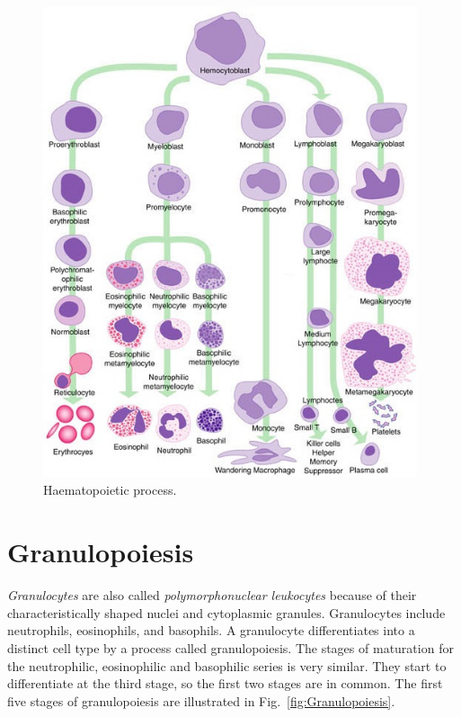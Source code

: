 \documentclass[final,a4paper,12pt,english]{UnicaPhdThesis3}
\begin{document}
\begin{figure}[!htbp]
\centering
\includegraphics[width=0.98\textwidth]{images/Hematopoiesis}
\caption{\label{fig:Haematopoiesis} Haematopoietic process.}
\end{figure}

\section{Granulopoiesis}
\textit{Granulocytes} are also called \textit{polymorphonuclear leukocytes} because of their characteristically shaped nuclei and cytoplasmic granules. Granulocytes include neutrophils, eosinophils, and basophils. A granulocyte differentiates into a distinct cell type by a process called granulopoiesis. The stages of maturation for the neutrophilic, eosinophilic and basophilic series is very similar. They start to differentiate at the third stage, so the first two stages are in common. The first five stages of granulopoiesis are illustrated in Fig.~\ref{fig:Granulopoiesis}.
 
\end{document}
